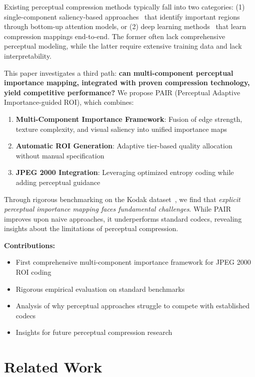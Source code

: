 \documentclass[conference]{IEEEtran}
\begin{document}
Existing perceptual compression methods typically fall into two categories: (1) single-component saliency-based approaches~\cite{guo2010visual} that identify important regions through bottom-up attention models, or (2) deep learning methods~\cite{balle2018variational} that learn compression mappings end-to-end. The former often lack comprehensive perceptual modeling, while the latter require extensive training data and lack interpretability.

This paper investigates a third path: \textbf{can multi-component perceptual importance mapping, integrated with proven compression technology, yield competitive performance?} We propose PAIR (Perceptual Adaptive Importance-guided ROI), which combines:

\begin{enumerate}
    \item \textbf{Multi-Component Importance Framework}: Fusion of edge strength, texture complexity, and visual saliency into unified importance maps
    \item \textbf{Automatic ROI Generation}: Adaptive tier-based quality allocation without manual specification
    \item \textbf{JPEG 2000 Integration}: Leveraging optimized entropy coding while adding perceptual guidance
\end{enumerate}

Through rigorous benchmarking on the Kodak dataset~\cite{kodak}, we find that \textit{explicit perceptual importance mapping faces fundamental challenges}. While PAIR improves upon naive approaches, it underperforms standard codecs, revealing insights about the limitations of perceptual compression.

\textbf{Contributions:}
\begin{itemize}
    \item First comprehensive multi-component importance framework for JPEG 2000 ROI coding
    \item Rigorous empirical evaluation on standard benchmarks
    \item Analysis of why perceptual approaches struggle to compete with established codecs
    \item Insights for future perceptual compression research
\end{itemize}

\section{Related Work}
\end{document}
